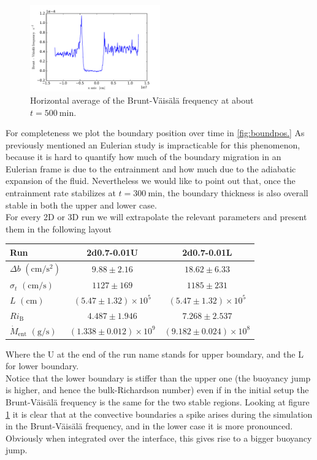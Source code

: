  \begin{figure}[t!]
\centering
\includegraphics[width=0.5\textwidth]{./img/brunt}
\caption{Horizontal average of the Brunt-Väisälä frequency at about $t=500 \ \mathrm{min}$.}
\label{fig:brunt}
\centering
\end{figure}
For completeness we plot the boundary position over time in \ref{fig:boundpos.} As previously mentioned an Eulerian study is impracticable for this phenomenon, because it is hard to quantify how much of the boundary migration in an Eulerian frame is due to the entrainment and how much due to the adiabatic expansion of the fluid. Nevertheless we would like to point out that, once the entrainment rate stabilizes at $t=300 \ \mathrm{min}$, the boundary thickness is also overall stable in both the upper and lower case. \\
For every 2D or 3D run we will extrapolate the relevant parameters and present them in the following layout
\begin{center}
 \begin{tabular}{l|c|c}
	 Run &2d0.7-0.01U&2d0.7-0.01L\\
	  	\hline
	   $\Delta b$ $(\mathrm{cm/s^{2}})$&$ 9.88 \pm 2.16 $&$18.62 \pm 6.33$\\
		\hline
	   $\sigma_t$ $(\mathrm{cm/s})$ &$ 1127 \pm 169 $&$1185 \pm 231$\\
		\hline
	   $L$ $(\mathrm{cm})$&$(5.47 \pm 1.32) \times 10^5$&$(5.47 \pm 1.32) \times 10^5$\\
		\hline
	   $Ri_{\mathrm{B}}$& $4.487 \pm 1.946 $&$7.268 \pm 2.537$\\
		\hline
	   $\dot{M}_{\mathrm{ent}}$ $(\mathrm{g/s})$ &$(1.338 \pm 0.012) \times 10^9$&$(9.182 \pm 0.024) \times 10^8$\\
      \end{tabular}
 \end{center}
 Where the U at the end of the run name stands for upper boundary, and the L for lower boundary. \\
 Notice that the lower boundary is stiffer than the upper one (the buoyancy jump is higher, and hence the bulk-Richardson number) even if in the initial setup the Brunt-Väisälä frequency is the same for the two stable regions. Looking at figure \ref{fig:brunt} it is clear that at the convective boundaries a spike arises during the simulation in the Brunt-Väisälä frequency, and in the lower case it is more pronounced. Obviously when integrated over the interface, this gives rise to a bigger buoyancy jump.


